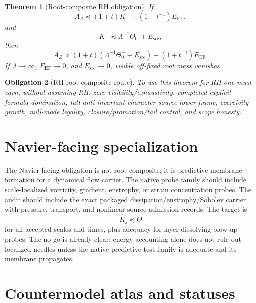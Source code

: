 \documentclass[11pt]{article}
\newtheorem{theorem}{Theorem}[section]
\newtheorem{obligation}[theorem]{Obligation}
\newcommand{\EF}{\mathrm{EF}}
\newcommand{\src}{\mathrm{src}}
\begin{document}
\begin{theorem}[Root-composite RH obligation]
If
\[
  A_Z\preceq(1+t)K^-+(1+t^{-1})E_{\EF},
\]
and
\[
  K^-\preceq\Lambda^{-1}\Theta_0^-+E_{\src},
\]
then
\[
  A_Z\preceq(1+t)(\Lambda^{-1}\Theta_0^-+E_{\src})+(1+t^{-1})E_{\EF}.
\]
If \(\Lambda\to\infty\), \(E_{\EF}\to0\), and \(E_{\src}\to0\), visible off-fixed root mass vanishes.
\end{theorem}

\begin{obligation}[RH root-composite route]
To use this theorem for RH one must earn, without assuming RH: zero visibility/exhaustivity, completed explicit-formula domination, full anti-invariant character-source lower frame, coercivity growth, null-mode legality, closure/promotion/tail control, and scope honesty.
\end{obligation}

\section{Navier-facing specialization}

The Navier-facing obligation is not root-composite; it is predictive membrane formation for a dynamical flow carrier.  The native probe family should include scale-localized vorticity, gradient, enstrophy, or strain concentration probes.  The audit should include the exact packaged dissipation/enstrophy/Sobolev carrier with pressure, transport, and nonlinear source-admission records.  The target is
\[
  \widehat K_j\preceq\Theta
\]
for all accepted scales and times, plus adequacy for layer-dissolving blow-up probes.  The no-go is already clear: energy accounting alone does not rule out localized needles unless the native predictive test family is adequate and its membrane propagates.

\section{Countermodel atlas and statuses}
\end{document}
